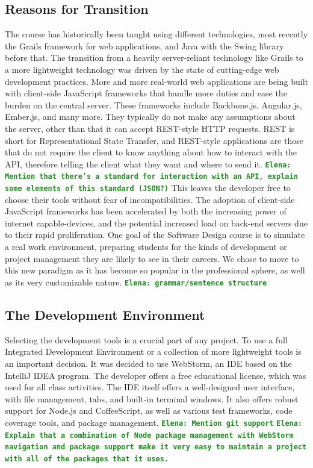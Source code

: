 \documentclass[12pt]{article}
\newcommand{\comment}[1]{{\bf \tt  {#1}}}
\newcommand{\emcomment}[1]{\textcolor{ForestGreen}{\comment{Elena: {#1}}}}
\begin{document}
\subsection{Reasons for Transition}\label{sec:reasons_for_transition}
The course has historically been taught using different technologies, most recently the Grails framework for web applications, and Java with the Swing library before that. The transition from a heavily server-reliant technology like Grails to a more lightweight technology was driven by the state of cutting-edge web development practices. More and more real-world web applications are being built with client-side JavaScript frameworks that handle more duties and ease the burden on the central server. These frameworks include Backbone.js, Angular.js, Ember.js, and many more. They typically do not make any assumptions about the server, other than that it can accept REST-style HTTP requests. REST is short for Representational State Transfer, and REST-style applications are those that do not require the client to know anything about how to interact with the API, therefore telling the client what they want and where to send it. \emcomment{Mention that there's a standard for interaction with an API, explain some elements of this standard (JSON?)}
This leaves the developer free to choose their tools without fear of incompatibilities. The adoption of client-side JavaScript frameworks has been accelerated by both the increasing power of internet capable-devices, and the potential increased load on back-end servers due to their rapid proliferation. One goal of the Software Design course is to simulate a real work environment, preparing students for the kinds of development or project management they are likely to see in their careers. We chose to move to this new paradigm as it has become so popular in the professional sphere, as well as its very customizable nature. 
\emcomment{grammar/sentence structure}

\subsection{The Development Environment}\label{sec:IDE}
Selecting the development tools is a crucial part of any project. To use a full Integrated Development Environment or a collection of more lightweight tools is an important decision. It was decided to use WebStorm, an IDE based on the IntelliJ IDEA program. The developer offers a free educational license, which was used for all class activities. The IDE itself offers a well-designed user interface, with file management, tabs, and built-in terminal windows. It also offers robust support for Node.js and CoffeeScript, as well as various test frameworks, code coverage tools, and package management. \emcomment{Mention git support}
\emcomment{Explain that a combination of Node package management with WebStorm navigation and package support make it very easy to maintain a project with all of the packages that it uses.}
\end{document}
